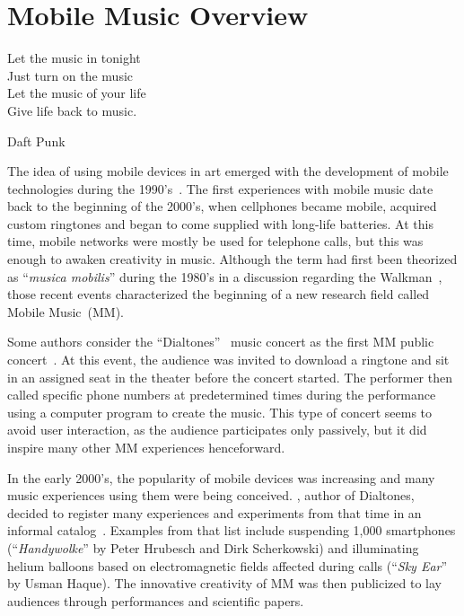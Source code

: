 \chapter{Mobile Music Overview}
\label{cap:mobilemusic}

 \epigraph{
	Let the music in tonight\\
	Just turn on the music\\
	Let the music of your life\\
	Give life back to music.}
 {Daft Punk}

The idea of using mobile devices in art emerged with the development of mobile technologies during the 1990's~\citep{deSouzaeSilva2004}.
The first experiences with mobile music date back to the beginning of the 2000's, when cellphones became mobile, acquired custom ringtones and began to come supplied with long-life batteries.
At this time, mobile networks were mostly be used for telephone calls, but this was enough to awaken creativity in music.
Although the term had first been theorized as ``\textit{musica mobilis}'' during the 1980's in a discussion regarding the Walkman~\citep[p.~5--6]{Gopinath2014handbookmobilemusicstudies1}, those recent events characterized the beginning of a new research field called Mobile Music~(MM).

Some authors consider the ``Dialtones''~\citep{Levin2001} music concert as the first MM public concert~\citep{Wang2014ocarina,Weinberg2005interconnected}.
At this event, the audience was invited to download a ringtone and sit in an assigned seat in the theater before the concert started.
The performer then called specific phone numbers at predetermined times during the performance using a computer program to create the music.
This type of concert seems to avoid user interaction, as the audience participates only passively, but it did inspire many other MM experiences henceforward.

In the early 2000's, the popularity of mobile devices was increasing and many music experiences using them were being conceived.
\citeauthor{Levin2004}, author of Dialtones, decided to register many experiences and experiments from that time in an informal catalog~\citep{Levin2004}.
Examples from that list include suspending 1,000 smartphones (``\textit{Handywolke}'' by Peter Hrubesch and Dirk Scherkowski) and illuminating helium balloons based on electromagnetic fields affected during calls (``\textit{Sky Ear}'' by Usman Haque).
The innovative creativity of MM was then publicized to lay audiences through performances and scientific papers.

